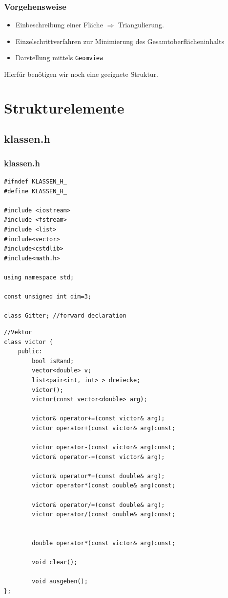 \documentclass{beamer}
\begin{document}
\begin{frame}
\frametitle{Vorgehensweise}
\begin{itemize}
\item Einbeschreibung einer Fläche $\Longrightarrow$ Triangulierung.
\item Einzelschrittverfahren zur Minimierung des Gesamtoberflächeninhalts
\item Darstellung mittels \texttt{Geomview}
\end{itemize}
Hierfür benötigen wir noch eine geeignete Struktur.
\end{frame}
\section{Strukturelemente}
\subsection{klassen.h}

\begin{frame}[fragile]
\frametitle{klassen.h}

\begin{lstlisting}
#ifndef KLASSEN_H_
#define KLASSEN_H_

#include <iostream>
#include <fstream>
#include <list>
#include<vector>
#include<cstdlib>
#include<math.h>

using namespace std;

const unsigned int dim=3;

class Gitter; //forward declaration
\end{lstlisting}

\end{frame}

\begin{frame}[fragile]
\begin{lstlisting}
//Vektor
class victor {
    public:
		bool isRand;
        vector<double> v;
        list<pair<int, int> > dreiecke;
        victor();
        victor(const vector<double> arg);

        victor& operator+=(const victor& arg);
        victor operator+(const victor& arg)const;

        victor operator-(const victor& arg)const;
        victor& operator-=(const victor& arg);

        victor& operator*=(const double& arg);
        victor operator*(const double& arg)const;

        victor& operator/=(const double& arg);
        victor operator/(const double& arg)const;


        double operator*(const victor& arg)const;

        void clear();

        void ausgeben();
};
\end{lstlisting}
\end{frame}
\end{document}
